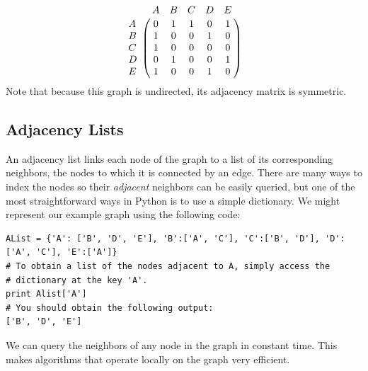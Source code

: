 \[
\bordermatrix{\hspace{.4cm}&A&B&C&D&E\cr
                A&0 & 1 & 1 & 0 & 1\cr
                B& 1 & 0 & 0 & 1 & 0\cr
                C& 1 & 0 & 0 & 0 & 0\cr
                D& 0 & 1 & 0 & 0 & 1\cr
                E& 1 & 0 & 0 & 1 & 0}\]
Note that because this graph is undirected, its adjacency matrix is symmetric. 

\subsection*{Adjacency Lists}
An adjacency list links each node of the graph to a list of its corresponding neighbors, the nodes to which it is connected by an edge.
There are many ways to index the nodes so their \emph{adjacent} neighbors can be easily queried, but one of the most straightforward ways in Python is to use a simple dictionary. 
We might represent our example graph using the following code:
\begin{lstlisting}
AList = {'A': ['B', 'D', 'E'], 'B':['A', 'C'], 'C':['B', 'D'], 'D':['A', 'C'], 'E':['A']}
# To obtain a list of the nodes adjacent to A, simply access the
# dictionary at the key 'A'.
print Alist['A']
# You should obtain the following output:
['B', 'D', 'E']
\end{lstlisting}
We can query the neighbors of any node in the graph in constant time.
This makes algorithms that operate locally on the graph very efficient.

